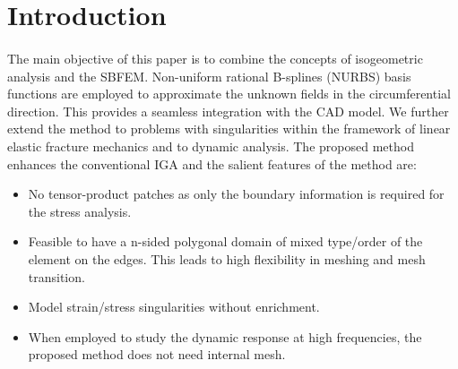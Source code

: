 
\section{Introduction}
\paragraph{}
The main objective of this paper is to combine the concepts of isogeometric analysis and the SBFEM.
Non-uniform rational B-splines (NURBS) basis functions are employed to approximate the unknown fields in the circumferential
    direction.
This provides a seamless integration with the CAD model.
We further extend the method to problems with singularities within the framework of linear elastic fracture mechanics and to
    dynamic analysis.
The proposed method enhances the conventional IGA and the salient features of the method are:
    \begin{itemize}
        \item No tensor-product patches as only the boundary information is required for the stress analysis.
        \item Feasible to have a n-sided polygonal domain of mixed type/order of the element on the edges.
                This leads to high flexibility in meshing and mesh transition.
        \item Model strain/stress singularities without enrichment.
        \item When employed to study the dynamic response at high frequencies, the proposed method does not need internal mesh.
    \end{itemize}

\paragraph{}
\pagebreak
